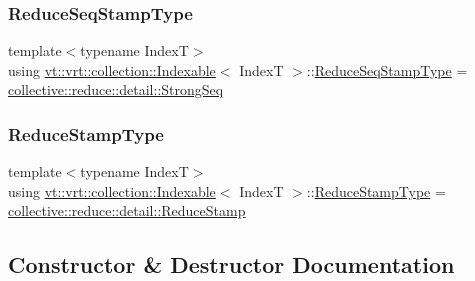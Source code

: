 \mbox{\label{structvt_1_1vrt_1_1collection_1_1_indexable_af259d608ccabcbe13680763fe5f1c656}} 
\subsubsection{\texorpdfstring{Reduce\+Seq\+Stamp\+Type}{ReduceSeqStampType}}
{\footnotesize\ttfamily template$<$typename IndexT$>$ \\
using \hyperlink{structvt_1_1vrt_1_1collection_1_1_indexable}{vt\+::vrt\+::collection\+::\+Indexable}$<$ IndexT $>$\+::\hyperlink{structvt_1_1vrt_1_1collection_1_1_indexable_af259d608ccabcbe13680763fe5f1c656}{Reduce\+Seq\+Stamp\+Type} =  \hyperlink{namespacevt_1_1collective_1_1reduce_1_1detail_affec2854d7d65bafb17eb259714e9443}{collective\+::reduce\+::detail\+::\+Strong\+Seq}}

\mbox{\label{structvt_1_1vrt_1_1collection_1_1_indexable_a0369a8abcf13550caec736365f7fb30f}} 
\subsubsection{\texorpdfstring{Reduce\+Stamp\+Type}{ReduceStampType}}
{\footnotesize\ttfamily template$<$typename IndexT$>$ \\
using \hyperlink{structvt_1_1vrt_1_1collection_1_1_indexable}{vt\+::vrt\+::collection\+::\+Indexable}$<$ IndexT $>$\+::\hyperlink{structvt_1_1vrt_1_1collection_1_1_indexable_a0369a8abcf13550caec736365f7fb30f}{Reduce\+Stamp\+Type} =  \hyperlink{namespacevt_1_1collective_1_1reduce_1_1detail_abcd205dec83706f347d55c7528bf2664}{collective\+::reduce\+::detail\+::\+Reduce\+Stamp}}



\subsection{Constructor \& Destructor Documentation}
\mbox{\label{structvt_1_1vrt_1_1collection_1_1_indexable_ad3f327a35771a31ec63241b9be57569c}} 
